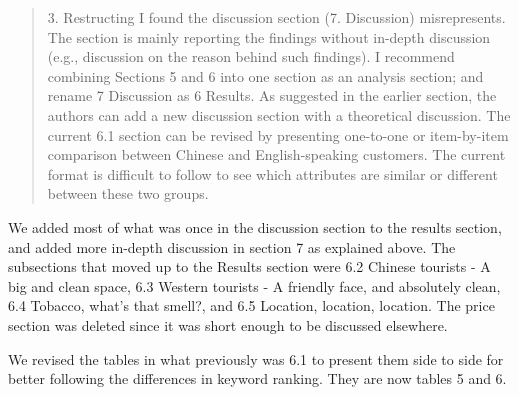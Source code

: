 \documentclass{letter}
\begin{document}
\begin{quotation}
3. Restructing
I found the discussion section (7. Discussion) misrepresents. The section is mainly reporting the findings without in-depth discussion (e.g., discussion on the reason behind such findings). I recommend combining Sections 5 and 6 into one section as an analysis section; and rename 7 Discussion as 6 Results. As suggested in the earlier section, the authors can add a new discussion section with a theoretical discussion.
The current 6.1 section can be revised by presenting one-to-one or item-by-item comparison between Chinese and English-speaking customers. The current format is difficult to follow to see which attributes are similar or different between these two groups.
\end{quotation}

We added most of what was once in the discussion section to the results section, and added more in-depth discussion in section 7 as explained above. The subsections that moved up to the Results section were 6.2 Chinese tourists - A big and clean space, 6.3 Western tourists - A friendly face, and absolutely clean, 6.4 Tobacco, what’s that smell?, and 6.5 Location, location, location. The price section was deleted since it was short enough to be discussed elsewhere.

We revised the tables in what previously was 6.1 to present them side to side for better following the differences in keyword ranking. They are now tables 5 and 6.
\end{document}
